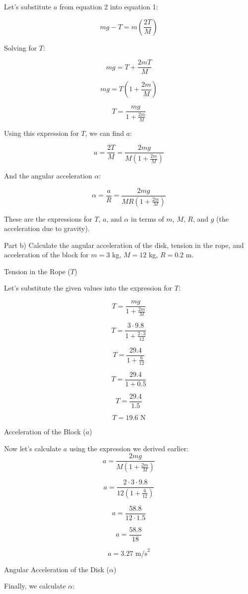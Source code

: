 \documentclass[a4paper,11pt]{article}
\begin{document}
Let's substitute \( a \) from equation 2 into equation 1:

\[
m g - T = m \left( \frac{2T}{M} \right)
\]

Solving for \( T \):

\[
m g = T + \frac{2mT}{M}
\]

\[
m g = T \left( 1 + \frac{2m}{M} \right)
\]

\[
T = \frac{m g}{1 + \frac{2m}{M}}
\]

Using this expression for \( T \), we can find \( a \):

\[
a = \frac{2T}{M} = \frac{2m g}{M \left( 1 + \frac{2m}{M} \right)}
\]

And the angular acceleration \( \alpha \):

\[
\alpha = \frac{a}{R} = \frac{2m g}{M R \left( 1 + \frac{2m}{M} \right)}
\]

These are the expressions for \( T \), \( a \), and \( \alpha \) in terms of \( m \), \( M \), \( R \), and \( g \) (the acceleration due to gravity).

Part b) Calculate the angular acceleration of the disk, tension in the rope, and acceleration of the block for \( m = 3 \) kg, \( M = 12 \) kg, \( R = 0.2 \) m.

Tension in the Rope (\( T \))

Let's substitute the given values into the expression for \( T \):

\[
T = \frac{m g}{1 + \frac{2m}{M}}
\]

\[
T = \frac{3 \cdot 9.8}{1 + \frac{2 \cdot 3}{12}}
\]

\[
T = \frac{29.4}{1 + \frac{6}{12}}
\]

\[
T = \frac{29.4}{1 + 0.5}
\]

\[
T = \frac{29.4}{1.5}
\]

\[
T = 19.6 \text{ N}
\]

Acceleration of the Block (\( a \))

Now let's calculate \( a \) using the expression we derived earlier:
\[
a = \frac{2m g}{M \left( 1 + \frac{2m}{M} \right)}
\]

\[
a = \frac{2 \cdot 3 \cdot 9.8}{12 \left( 1 + \frac{6}{12} \right)}
\]

\[
a = \frac{58.8}{12 \cdot 1.5}
\]

\[
a = \frac{58.8}{18}
\]

\[
a = 3.27 \text{ m/s}^2
\]

Angular Acceleration of the Disk (\( \alpha \))

Finally, we calculate \( \alpha \):
\end{document}
